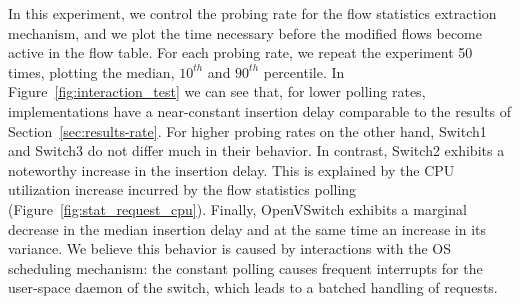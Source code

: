 In this experiment, we control the probing rate for the flow statistics 
extraction mechanism, and we plot the time necessary before the modified 
flows become active in the flow table. For each probing rate, we
repeat the experiment 50 times, plotting the median, $10^{th}$ and 
$90^{th}$ percentile. In Figure~\ref{fig:interaction_test} we can see
that, for lower polling rates, implementations have a near-constant
insertion delay comparable to the results of Section~\ref{sec:results-rate}.
For higher probing rates on the other hand, Switch1 and Switch3 do 
not differ much in their behavior. In contrast, Switch2 exhibits a noteworthy 
increase in the insertion delay. This is explained by the CPU utilization increase
incurred by the flow statistics polling (Figure~\ref{fig:stat_request_cpu}). Finally,
OpenVSwitch exhibits a marginal decrease in the median insertion delay
and at the same time an increase in its variance. We believe this behavior 
is caused by interactions with the OS scheduling mechanism: the constant 
polling causes frequent interrupts for the user-space daemon of the switch, 
which leads to a batched handling of requests.

